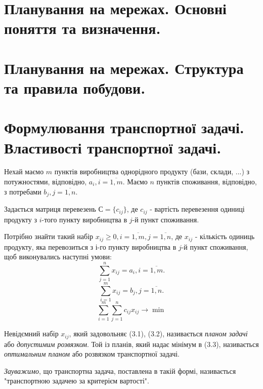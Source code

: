 \documentclass[12pt,a4paper]{article}
\begin{document}
\clearpage

\section{Планування на мережах. Основні поняття та визначення.}

\clearpage

\section{Планування на мережах. Структура та правила побудови.}

\clearpage

\section{Формулювання транспортної задачі. Властивості транспортної задачі.}

Нехай маємо $m$ пунктів виробництва однорідного продукту (бази, склади, ...) з потужностями, відповідно, $a_i, i = \overline{1, m}$. Маємо $n$ пунктів споживання, відповідно, з потребами $b_j, j =\overline{1, n}$.

Задається матриця перевезень $С = \{c_{ij}\}$, де $c_{ij}$ - вартість перевезення одиниці продукту з $i$-того пункту виробництва в $j$-й пункт споживання.

Потрібно знайти такий набір $x_{ij} \geq 0, i = \overline{1, m}, j = \overline{1, n}$, де  $x_{ij}$ - кількість одиниць продукту, яка перевозиться з $і$-го пункту виробництва в $j$-й пункт споживання, щоб виконувались наступні умови: 
\begin{equation}  \sum_{j=1}^n x_{ij} = a_i, i = \overline{1, m}. \end{equation}
\begin{equation} \sum_{i=1}^m x_{ij} = b_j, j = \overline{1, n}.   \end{equation}
\begin{equation} \sum_{i=1}^m \sum_{j=1}^n c_{ij} x_{ij} \to \min  \end{equation}

Невідємний набір $x_{ij}$, який задовольняє (3.1), (3.2), називається \emph{планом задачі} або \emph{допустимим розвязком}. Той із планів, який надає мінімум в (3.3), називається \emph{оптимальним планом} або розвязком транспортної задачі.

\emph{Зауважимо}, що транспортна задача, поставлена в такій формі, називається "транспортною задачею за критерієм вартості".
\end{document}

